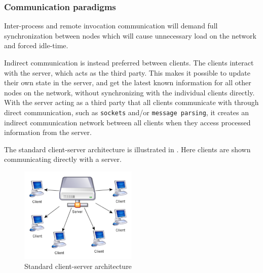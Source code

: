 




\subsubsection{Communication paradigms}
Inter-process and remote invocation communication will demand full synchronization between nodes which will cause unnecessary load on the network and forced idle-time. \smallskip

Indirect communication is instead preferred between clients. The clients interact with the server, which acts as the third party. This makes it possible to update their own state in the server, and get the latest known information for all other nodes on the network, without synchronizing with the individual clients directly. With the server acting as a third party that all clients communicate with through direct communication, such as \texttt{sockets} and/or \texttt{message parsing}, it creates an indirect communication network between all clients when they access processed information from the server. \smallskip

The standard client-server architecture is illustrated in . Here clients are shown communicating directly with a server.

\begin{figure}[H]
    \centering
    \includegraphics[width=0.5\textwidth]{images/ClientServer.png}
    \caption{Standard client-server architecture \cite{clientServerFig}}
    \label{fig:ClientServer}
\end{figure}

